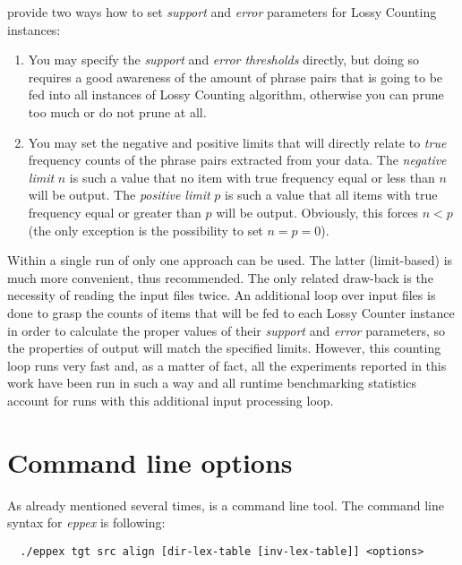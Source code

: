 \Eppex{} provide two ways how to set \emph{support} and \emph{error} parameters
for Lossy Counting instances:
\begin{enumerate}
  \item You may specify the \emph{support} and \emph{error thresholds} directly, but doing so
    requires a good awareness of the amount of phrase pairs that is going to be fed into all
    instances of Lossy Counting algorithm, otherwise you can prune too much or do not prune at all.
  \item You may set the negative and positive limits that will directly relate to \emph{true}
    frequency counts of the phrase pairs extracted from your data. The \emph{negative limit}
    $n$ is such a value that no item with true frequency equal or less than $n$ will be output.
    The \emph{positive limit} $p$ is such a value that all items with true frequency equal
    or greater than $p$ will be output. Obviously, this forces $n < p$ (the only exception
    is the possibility to set $n = p = 0$).
\end{enumerate}

Within a single run of \eppex{} only one approach can be used.
The latter (limit-based) is much more convenient, thus recommended.
The only related draw-back is the necessity of reading the input files twice.
An additional loop over input files is done to grasp the counts of items
that will be fed to each Lossy Counter instance in order to calculate
the proper values of their \emph{support} and \emph{error} parameters,
so the properties of output will match the specified limits.
However, this counting loop runs very fast and, as a matter of fact, all the \eppex{}
experiments reported in this work have been run in such a way and all runtime
benchmarking statistics account for runs with this additional input processing loop.

\section{Command line options}

As already mentioned several times, \eppex{} is a command line tool.
The command line syntax for \emph{eppex} is following:

\begin{verbatim}
  ./eppex tgt src align [dir-lex-table [inv-lex-table]] <options>
\end{verbatim}

